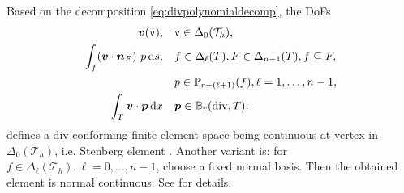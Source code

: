 \documentclass[10pt]{amsart}
\begin{document}
Based on the decomposition \eqref{eq:divpolynomialdecomp}, the DoFs
\begin{align*}
\boldsymbol v(\texttt{v}), &\quad  \texttt{v}\in \Delta_{0}(\mathcal T_h),\\
\int_f (\boldsymbol v\cdot \boldsymbol n_F)\ p \,{\rm d} s, &\quad  f\in \Delta_{\ell}(T), F\in \Delta_{n-1}(T), f\subseteq F, \\
& \quad p\in \mathbb P_{r - (\ell +1)} (f), \ell = 1,\ldots, n-1, \notag\\
\int_T \boldsymbol v \cdot \boldsymbol p \,{\rm d}x&\quad \boldsymbol p\in \mathbb B_r(\operatorname{div}, T). 
\end{align*}
defines a div-conforming finite element space being continuous at vertex in $\Delta_{0}(\mathcal T_h)$, i.e. Stenberg element \cite{Stenberg2010}. Another variant is: for $f\in \Delta_{\ell}(\mathcal T_h), \ell =0,\ldots, n-1$, choose a fixed normal basis. Then the obtained element is normal continuous. See  \cite{Chen;Huang:2021Geometric} for details.
\end{document}
